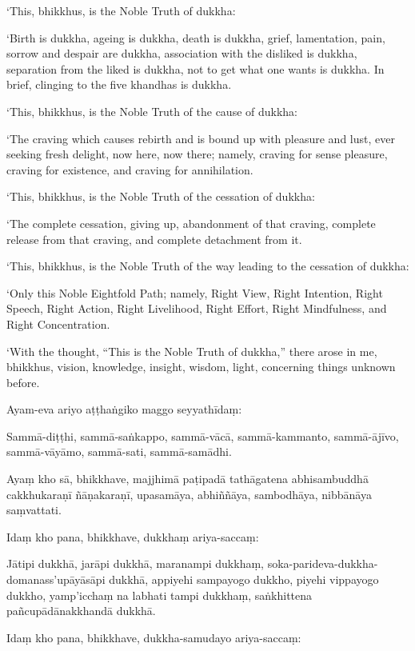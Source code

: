 ‘This, bhikkhus, is the Noble Truth of dukkha:

‘Birth is dukkha, ageing is dukkha, death is dukkha, grief,
lamentation, pain, sorrow and despair are dukkha, association with the
disliked is dukkha, separation from the liked is dukkha, not to get what
one wants is dukkha. In brief, clinging to the five khandhas is dukkha.

‘This, bhikkhus, is the Noble Truth of the cause of dukkha:

‘The craving which causes rebirth and is bound up with pleasure and
lust, ever seeking fresh delight, now here, now there; namely, craving
for sense pleasure, craving for existence, and craving for annihilation.

‘This, bhikkhus, is the Noble Truth of the cessation of dukkha:

‘The complete cessation, giving up, abandonment of that craving,
complete release from that craving, and complete detachment from it.

‘This, bhikkhus, is the Noble Truth of the way leading to the cessation
of dukkha:

‘Only this Noble Eightfold Path; namely, Right View, Right Intention,
Right Speech, Right Action, Right Livelihood, Right Effort, Right
Mindfulness, and Right Concentration.

‘With the thought, “This is the Noble Truth of dukkha,” there arose in
me, bhikkhus, vision, knowledge, insight, wisdom, light, concerning
things unknown before.

\clearpage

\paliText
\markboth{\paliTitle}{\rightmark}

Ayam-eva ariyo aṭṭhaṅgiko maggo seyyathīdaṃ:

Sammā-diṭṭhi, sammā-saṅkappo, sammā-vācā, sammā-kammanto, sammā-ājīvo,
sammā-vāyāmo, sammā-sati, sammā-samādhi.

Ayaṃ kho sā, bhikkhave, majjhimā paṭipadā tathāgatena abhisambuddhā
cakkhukaraṇī ñāṇakaraṇī, upasamāya, abhiññāya, sambodhāya, nibbānāya
saṃvattati.

Idaṃ kho pana, bhikkhave, dukkhaṃ ariya-saccaṃ:

Jātipi dukkhā, jarāpi dukkhā, maranampi dukkhaṃ,
soka-parideva-dukkha-domanass'upāyāsāpi dukkhā, appiyehi sampayogo
dukkho, piyehi vippayogo dukkho, yamp'icchaṃ na labhati tampi dukkhaṃ,
saṅkhittena pañcupādānakkhandā dukkhā.

Idaṃ kho pana, bhikkhave, dukkha-samudayo ariya-saccaṃ:

